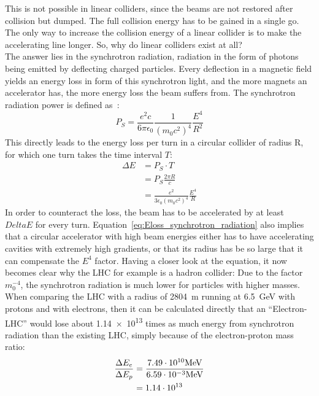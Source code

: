 This is not possible in linear colliders, since the beams are not restored after collision but dumped.
The full collision energy has to be gained in a single go.
The only way to increase the collision energy of a linear collider is to make the accelerating line longer. So, why do linear colliders exist at all?\\
The answer lies in the synchrotron radiation, radiation in the form of photons being emitted by deflecting charged particles.
Every deflection in a magnetic field yields an energy loss in form of this synchrotron light, and the more magnets an accelerator has, the more energy loss the beam suffers from.
The synchrotron radiation power is defined as~\cite[p. 33]{Wille}:
\begin{equation}
 P_S = \frac{e^2c}{6\pi\epsilon_0}\frac{1}{(m_0c^2)^4}\frac{E^4}{R^2}
\end{equation}
This directly leads to the energy loss per turn in a circular collider of radius R, for which one turn takes the time interval $T$:
\begin{align}
 \Delta E &= P_S\cdot T\\
 &= P_S\frac{2\pi R}{c}\\
 &=\frac{e^2}{3\epsilon_0(m_0c^2)^4}\frac{E^4}{R} \label{eq:Eloss_synchrotron_radiation}
\end{align}
In order to counteract the loss, the beam has to be accelerated by at least $Delta E$ for every turn.
Equation~\ref{eq:Eloss_synchrotron_radiation} also implies that a circular accelerator with high beam energies either has to have accelerating cavities with extremely high gradients, or that its radius has be so large that it can compensate the $E^4$ factor.
Having a closer look at the equation, it now becomes clear why the LHC for example is a hadron collider:
Due to the factor $m_0^{-4}$, the synchrotron radiation is much lower for particles with higher masses.
When comparing the LHC with a radius of \SI{2804}{\meter} running at \SI{6.5}{\GeV} with protons and with electrons, then it can be calculated directly that an ``Electron-LHC'' would lose about \num{1.14e13} times as much energy from synchrotron radiation than the existing LHC, simply because of the electron-proton mass ratio:
\begin{align*}
 \frac{\Delta E_e}{\Delta E_p} &= \frac{7.49\cdot10^{10} \textnormal{MeV}}{6.59\cdot10^{-3} \textnormal{MeV}}\\
 &=1.14\cdot10^{13}
\end{align*}
